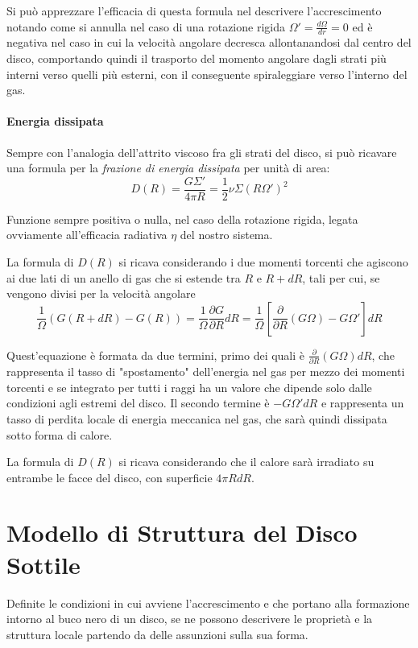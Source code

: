 \documentclass[a4paperbi]{article}
\begin{document}
	Si può apprezzare l'efficacia di questa formula nel descrivere l'accrescimento notando come si annulla nel caso di una rotazione rigida $\Omega'=\frac{d\Omega}{dr}=0$ ed è negativa nel caso in cui la velocità angolare decresca allontanandosi dal centro del disco, comportando quindi il trasporto del momento angolare dagli strati più interni verso quelli più esterni, con il conseguente spiraleggiare verso l'interno del gas.	
					
	\paragraph{Energia dissipata}
	Sempre con l'analogia dell'attrito viscoso fra gli strati del disco, si può ricavare una formula per la \textit{frazione di energia dissipata} per unità di area:
	\begin{equation}
		D(R)=\frac{G\Sigma'}{4\pi R}=\frac{1}{2}\nu\Sigma(R\Omega')^2
	\end{equation}
	
	Funzione sempre positiva o nulla, nel caso della rotazione rigida, legata ovviamente all'efficacia radiativa $\eta$ del nostro sistema.
	
	La formula di $D(R)$ si ricava considerando i due momenti torcenti che agiscono ai due lati di un anello di gas che si estende tra $R$ e $R+dR$, tali per cui, se vengono divisi per la velocità angolare
	\begin{equation}
		\frac{1}{\Omega}(G(R+dR)-G(R))=\frac{1}{\Omega}\frac{\partial G}{\partial R}dR=\frac{1}{\Omega}\left[\frac{\partial}{\partial R}(G\Omega)-G\Omega'\right]dR
	\end{equation}
	
	Quest'equazione è formata da due termini, primo dei quali è $\frac{\partial}{\partial R}(G\Omega)dR$, che rappresenta il tasso di "spostamento" dell'energia nel gas per mezzo dei momenti torcenti e se integrato per tutti i raggi ha un valore che dipende solo dalle condizioni agli estremi del disco. Il secondo termine è $-G\Omega'dR$ e rappresenta un tasso di perdita locale di energia meccanica nel gas, che sarà quindi dissipata sotto forma di calore.
	
	La formula di $D(R)$ si ricava considerando che il calore sarà irradiato su entrambe le facce del disco, con superficie $4\pi RdR$.
	
\newpage
\section{Modello di Struttura del Disco Sottile}
	Definite le condizioni in cui avviene l'accrescimento e che portano alla formazione intorno al buco nero di un disco, se ne possono descrivere le proprietà e la struttura locale partendo da delle assunzioni sulla sua forma. 
	
\end{document}
